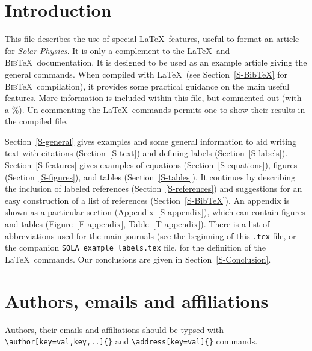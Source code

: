 \documentclass[namedreferences]{solarphysics}
\newcommand{\BibTeX}{\textsc{Bib}\TeX}
\begin{document}
\begin{article}
\section{Introduction}
     \label{S-Introduction} 

This file describes the use of special \LaTeX\ features,
useful to format an article for {\it Solar Physics}.  It is only a complement
to the \LaTeX\ and \BibTeX\ documentation.  
It is designed to be used as an example
article giving the general commands. When compiled with \LaTeX\ 
(see Section~\ref{S-BibTeX} for \BibTeX\ compilation), it provides
some practical guidance on the main useful features. More information
is included within this file, but commented out (with a \%).
Un-commenting the \LaTeX\ commands permits one to show their 
results in the compiled file.   
    
 Section~\ref{S-general} gives examples and some general information
to aid writing text with citations (Section~\ref{S-text})
and defining labels (Section~\ref{S-labels}).
Section~\ref{S-features} gives examples of equations 
(Section~\ref{S-equations}), figures (Section~\ref{S-figures}), and 
tables (Section~\ref{S-tables}).
It continues by describing the inclusion of labeled references
(Section~\ref{S-references}) and suggestions for an easy construction 
of a list of references (Section~\ref{S-BibTeX}). 
An appendix is shown as a particular section (Appendix~\ref{S-appendix}),
which can contain figures and tables (Figure~\ref{F-appendix}, 
Table~\ref{T-appendix}).
There is a list of abbreviations used for the main journals (see the
beginning of this \texttt{.tex} file, or the companion 
 \verb+SOLA_example_labels.tex+ 
file, for the definition of the \LaTeX\ commands.
Our conclusions are given in Section~\ref{S-Conclusion}. 

\section{Authors, emails and affiliations}
\label{S-aug}
Authors, their emails and affiliations should be typsed with \verb+\author[key=val,key,..]{}+ and \verb+\address[key=val]{}+ commands.


\end{article}
\end{document}
